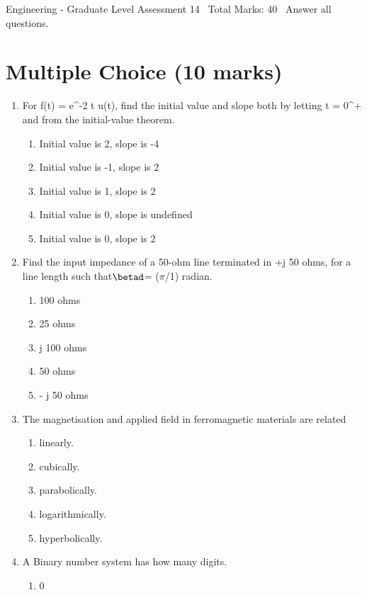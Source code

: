 \documentclass[12pt]{article}
\begin{document}
\begin{center}
Engineering - Graduate Level Assessment 14 \
Total Marks: 40 \
Answer all questions.
\end{center}

\section*{Multiple Choice (10 marks)}
\begin{enumerate}[label=\arabic*.]
\item For f(t) = e^-2 t u(t), find the initial value and slope both by letting t = 0^+ and from the initial-value theorem.
\begin{enumerate}[label=(\alph*)]
    \item Initial value is 2, slope is -4
    \item Initial value is -1, slope is 2
    \item Initial value is 1, slope is 2
    \item Initial value is 0, slope is undefined
    \item Initial value is 0, slope is 2
\end{enumerate}
\item Find the input impedance of a 50-ohm line terminated in +j 50 ohms, for a line length such that\ensuremath{\betad}= (\ensuremath{\pi}/1) radian.
\begin{enumerate}[label=(\alph*)]
    \item 100 ohms
    \item 25 ohms
    \item j 100 ohms
    \item 50 ohms
    \item - j 50 ohms
\end{enumerate}
\item The magnetisation and applied field in ferromagnetic materials are related
\begin{enumerate}[label=(\alph*)]
    \item linearly.
    \item cubically.
    \item parabolically.
    \item logarithmically.
    \item hyperbolically.
\end{enumerate}
\item A Binary number system has how many digits.
\begin{enumerate}[label=(\alph*)]
    \item 0

\end{enumerate}
\end{enumerate}
\end{document}
